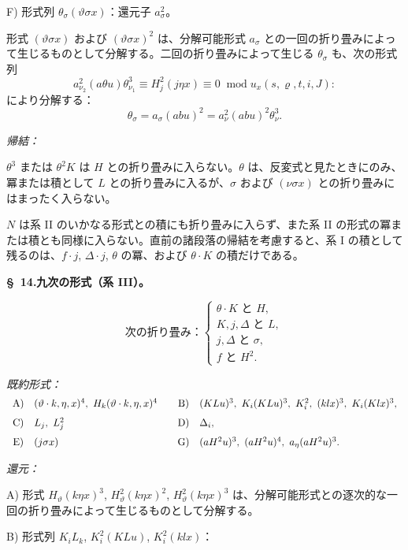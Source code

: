 \documentclass[11pt]{jlreq}
\newcommand{\A}{\Delta}
\newcommand{\R}{\varrho}
\newcommand{\modu}[1]{\;\operatorname{mod} #1}
\begin{document}
\noindent F) 形式列 $\theta_\sigma(\vartheta\sigma x)$：還元子 $a_\sigma^2$。

形式 $(\vartheta\sigma x)$ および $(\vartheta\sigma x)^2$ は、分解可能形式 $a_\sigma$ との一回の折り畳みによって生じるものとして分解する。二回の折り畳みによって生じる $\theta_\sigma$ も、次の形式列
\[
a_{\nu_2}^2(a\theta u)\theta_{\nu_1}^3\equiv H_j^2(j\eta x)\equiv0\modu{u_x(s,\R,t,i,J)}:
\]
により分解する：
\[
\theta_\sigma=a_\sigma(abu)^2=a_\nu^2(abu)^2\theta_\nu^3.
\]

\noindent\emph{帰結：}

$\theta^3$ または $\theta^2K$ は $H$ との折り畳みに入らない。$\theta$ は、反変式と見たときにのみ、冪または積として $L$ との折り畳みに入るが、$\sigma$ および $(\nu\sigma x)$ との折り畳みにはまったく入らない。

$N$ は系 II のいかなる形式との積にも折り畳みに入らず、また系 II の形式の冪または積とも同様に入らない。直前の諸段落の帰結を考慮すると、系 I の積として残るのは、$f\cdot j$, $\A\cdot j$, $\theta$ の冪、および $\theta\cdot K$ の積だけである。

\begin{center}
\textbf{\S\ 14.\quad 九次の形式（系 III）。}
\end{center}
\[
\text{次の折り畳み：}\left\{\begin{array}{l}
\theta\cdot K\text{ と }H,\\
K,j,\A\text{ と }L,\\
j,\A\text{ と }\sigma,\\
f\text{ と }H^2.
\end{array}\right.
\]

\noindent\emph{既約形式：}
\[
\begin{array}{c@{\quad}l@{\qquad}c@{\quad}l}
\text{A)}&(\vartheta\cdot k,\eta,x)^4,
\ H_k(\vartheta\cdot k,\eta,x)^4&
\text{B)}&(KLu)^3,
\ K_i(KLu)^3,
\ K_i^2,
\ (klx)^3,
\ K_i(Klx)^3,\\[0.7em]
\text{C)}&L_j,
\ L_j^2&
\text{D)}&\A_i,\\[0.7em]
\text{E)}&(j\sigma x)&
\text{G)}&(aH^2u)^3,
\ (aH^2u)^4,
\ a_\eta(aH^2u)^3.
\end{array}
\]

\noindent\emph{還元：}

A) 形式 $H_\vartheta(k\eta x)^3$, $H_\vartheta^2(k\eta x)^2$, $H_\vartheta^2(k\eta x)^3$ は、分解可能形式との逐次的な一回の折り畳みによって生じるものとして分解する。

B) 形式列 $K_iL_k$, $K_i^2(KLu)$, $K_i^2(klx)$：
\end{document}
